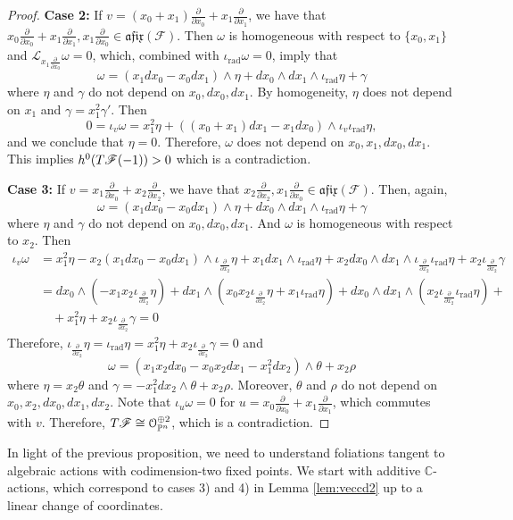 \documentclass[twoside]{amsart}
\numberwithin{equation}{section}
\newcommand{\opn}{{\mathcal O}_{\mathbb{P}^{n}}}
\DeclareMathOperator{\rad}{rad}
\def\CC{{\mathbb{C}}}
\newcommand{\sF}{\mathscr{F}}
\newcommand{\tF}{{\rm T}\sF}
\newcommand{\afix}{\mathfrak{afix}}
\newcommand{\lieder}{\mathcal{L}}
\newcommand{\del}[1]{\frac{\partial}{\partial #1}}
\theoremstyle{definition}
\begin{document}
\begin{proof}
{
\medskip\noindent
\textbf{Case 2:} If  $v = (x_0+ x_1)\del{ x_0} + x_1\del{ x_1}$, we have that $ x_0\del{ x_0} + x_1\del{ x_1} ,x_1\del{ x_0} \in \afix(\sF)$. Then $\omega$ is homogeneous with respect to $\{x_0,x_1\}$  and $\lieder_{x_1\del{ x_0}}\omega = 0$, which, combined with $\iota_{\rad}\omega=0$, imply that
\[
\omega = (x_1dx_0-x_0dx_1)\wedge \eta + dx_0\wedge dx_1 \wedge \iota_{\rad}\eta + \gamma
\]
where $\eta$ and $\gamma$ do not depend on $x_0, dx_0,dx_1$. By homogeneity, $\eta$ does not depend on $x_1$ and $\gamma = x_1^2\gamma'$. Then
\[
0 = \iota_v\omega = x_1^2\eta + ((x_0+x_1)dx_1 -x_1dx_0)\wedge \iota_v\iota_{\rad}\eta, 
\]
and we conclude that $\eta = 0$. Therefore, $\omega$ does not depend on $x_0,x_1,dx_0,dx_1$. This implies $h^0(\tF(-1)) >0$ which is a contradiction.


\medskip\noindent
\textbf{Case 3:} If $v = x_1\del{ x_0} + x_2\del{ x_2}$, we have that $ x_2\del{ x_2} ,x_1\del{ x_0} \in \afix(\sF)$. Then, again, 
\[
\omega = (x_1dx_0-x_0dx_1)\wedge \eta + dx_0\wedge dx_1 \wedge \iota_{\rad}\eta +\gamma
\]
where $\eta$ and $\gamma$ do not depend on $x_0, dx_0,dx_1$. And $\omega$ is homogeneous with respect to $x_2$. Then
\begin{align*}
\iota_v\omega & = x_1^2\eta -x_2 (x_1dx_0-x_0dx_1)\wedge \iota_{\del{ x_2}}\eta + x_1dx_1\wedge  \iota_{\rad}\eta + x_2 dx_0\wedge dx_1 \wedge \iota_{\del{ x_2}}\iota_{\rad}\eta + x_2 \iota_{\del{ x_2}}\gamma \\
&= dx_0\wedge ( -x_1 x_2 \iota_{\del{ x_2}}\eta) + 
    dx_1 \wedge( x_0x_2\iota_{\del{ x_2}}\eta + x_1\iota_{\rad}\eta ) +  
        dx_0\wedge dx_1\wedge(x_2 \iota_{\del{ x_2}}\iota_{\rad}\eta) + \\ & \quad
            + x_1^2\eta + x_2 \iota_{\del{ x_2}}\gamma   = 0 
\end{align*}
Therefore, $\iota_{\del{ x_2}}\eta =  \iota_{\rad}\eta =  x_1^2 \eta + x_2\iota_{\del{ x_2}}\gamma = 0$ and
\[
\omega = (x_1x_2dx_0-x_0x_2dx_1-x_1^2 dx_2)\wedge \theta + x_2\rho
\]
where $\eta = x_2\theta$ and $\gamma = -x_1^2dx_2\wedge \theta + x_2\rho$. Moreover, $\theta$ and $\rho$ do not depend on $x_0,x_2,dx_0,dx_1,dx_2$. Note that $\iota_{u}\omega = 0$ for $u = x_0\del{ x_0} + x_1\del{ x_1}$, which commutes with $v$. Therefore, $\tF \cong \opn^{\oplus 2}$, which is a contradiction. 
}
\end{proof}

 

In light of the previous proposition, we need to understand foliations tangent to algebraic actions with codimension-two fixed points. We start with additive $\CC$-actions, which correspond to cases 3) and 4) in Lemma \ref{lem:veccd2} up to a linear change of coordinates. 
\end{document}
